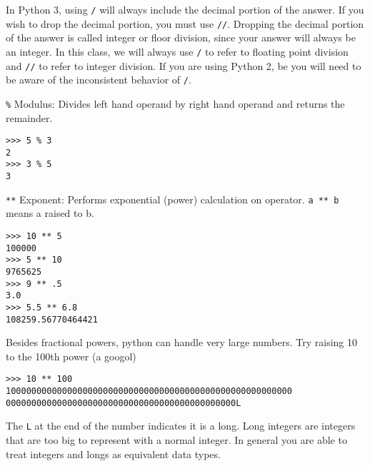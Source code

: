 \documentclass[12pt]{article}
\begin{document}
In Python 3, using \texttt{/} will always include the decimal portion of the answer. If you wish to drop the decimal portion, you must use \texttt{//}. Dropping the decimal portion of the answer is called integer or floor division, since your answer will always be an integer. In this class, we will always use \texttt{/} to refer to floating point division and \texttt{//} to refer to integer division. If you are using Python 2, be you will need to be aware of the inconsistent behavior of \texttt{/}.



\texttt{\%} Modulus: Divides left hand operand by right hand operand and returns the remainder.

\begin{lstlisting}[style=bash]
>>> 5 % 3
2
>>> 3 % 5
3
\end{lstlisting}

\texttt{**} Exponent: Performs exponential (power) calculation on operator. \texttt{a ** b} means a raised to b.

\begin{lstlisting}[style=bash]
>>> 10 ** 5
100000
>>> 5 ** 10 
9765625
>>> 9 ** .5
3.0
>>> 5.5 ** 6.8
108259.56770464421
\end{lstlisting}

Besides fractional powers, python can handle very large numbers. Try raising 10 to the 100th power (a googol)

\begin{lstlisting}[style=bash]
>>> 10 ** 100
10000000000000000000000000000000000000000000000000000000
000000000000000000000000000000000000000000000L
\end{lstlisting}

The \texttt{L} at the end of the number indicates it is a long. Long integers are integers that are too big to represent with a normal integer. In general you are able to treat integers and longs as equivalent data types.
\end{document}

